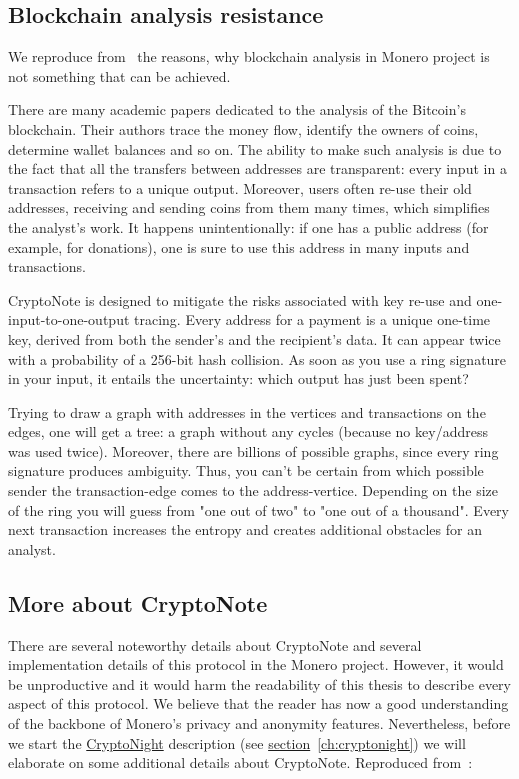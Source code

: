\subsection{Blockchain analysis resistance}
We reproduce from~\cite{cryptonote} the reasons, why blockchain analysis in Monero project is not something that can be achieved.

There are many academic papers dedicated to the analysis of the Bitcoin's blockchain. Their authors trace the money flow, identify the owners of coins, determine wallet balances and so on. The ability to make such analysis is due to the fact that all the transfers between addresses are transparent: every input in a transaction refers to a unique output. Moreover, users often re-use their old addresses, receiving and sending coins from them many times, which simplifies the analyst's work. It happens unintentionally: if one has a public address (for example, for donations), one is sure to use this address in many inputs and transactions.

CryptoNote is designed to mitigate the risks associated with key re-use and one-input-to-one-output tracing. Every address for a payment is a unique one-time key, derived from both the sender's and the recipient's data. It can appear twice with a probability of a 256-bit hash collision. As soon as you use a ring signature in your input, it entails the uncertainty: which output has just been spent?

Trying to draw a graph with addresses in the vertices and transactions on the edges, one will get a tree: a graph without any cycles (because no key/address was used twice). Moreover, there are billions of possible graphs, since every ring signature produces ambiguity. Thus, you can't be certain from which possible sender the transaction-edge comes to the address-vertice. Depending on the size of the ring you will guess from "one out of two" to "one out of a thousand". Every next transaction increases the entropy and creates additional obstacles for an analyst.

\subsection{More about CryptoNote}
There are several noteworthy details about CryptoNote and several implementation details of this protocol in the Monero project. However, it would be unproductive and it would harm the readability of this thesis to describe every aspect of this protocol. We believe that the reader has now a good understanding of the backbone of Monero's privacy and anonymity features. Nevertheless, before we start the \hyperref[ch:cryptonight]{CryptoNight} description (see \hyperref[ch:cryptonight]{section}~\ref{ch:cryptonight}) we will elaborate on some additional details about CryptoNote. Reproduced from~\cite{cryptonote}:

